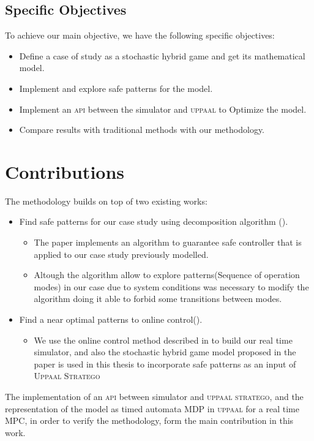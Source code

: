         \subsection*{Specific Objectives}
        To achieve our main objective, we have the following specific objectives:
        \begin{itemize}
            \item Define a case of study as a stochastic hybrid game and get its mathematical model.
            \item Implement and explore safe patterns for the model.
            \item Implement an \textsc{api} between the simulator and \textsc{uppaal} to Optimize the model.
            \item Compare results with traditional methods with our methodology.
        \end{itemize}


    \section{Contributions}
    \label{sec:contributions}
        The methodology builds on top of two existing works:      
        \begin{itemize}
            \item Find safe patterns for our case study using
            decomposition algorithm (\cite{le2017improved}).
                \begin{itemize}
                    \item The paper \cite{le2017improved} implements an algorithm to guarantee safe 
                    controller that is applied to our case study previously modelled.
                    \item Altough the algorithm allow to explore patterns(Sequence of operation modes) 
                    in our case due to system conditions was necessary to modify the 
                    algorithm doing it able to forbid some transitions between modes.                  
                \end{itemize}
            \item Find a near optimal patterns to online control(\cite{larsen2016online}).
            \begin{itemize}
                \item We use the online control method described in \cite{larsen2016online} to build our real time simulator, and also 
                the stochastic hybrid game model proposed in the paper is used in this thesis 
                to incorporate safe patterns as an input of \textsc{Uppaal Stratego}                
            \end{itemize}            
        \end{itemize}
        The implementation of an \textsc{api} between simulator and \textsc{uppaal stratego}, and 
        the representation of the model as timed automata \ac{MDP} in \textsc{uppaal} 
        for a real time \ac{MPC}, in order to verify the methodology, form 
        the main contribution in this work.            

